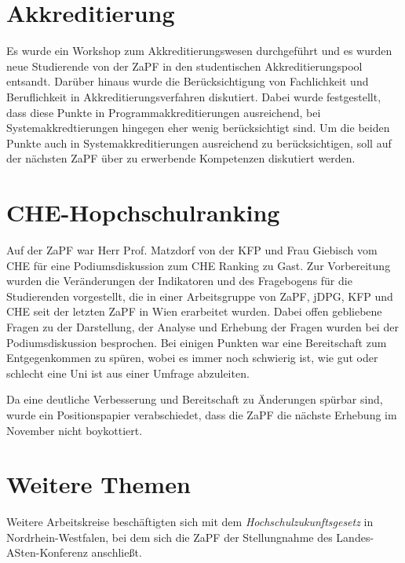 \documentclass{scrartcl}
\begin{document}
\section*{Akkreditierung}
Es  wurde ein Workshop zum Akkreditierungswesen durchgef\"uhrt und es wurden neue  Studierende von der ZaPF in den studentischen Akkreditierungspool entsandt. Dar\"uber hinaus wurde die Ber\"ucksichtigung von Fachlichkeit und Beruflichkeit in Akkreditierungsverfahren diskutiert. Dabei wurde festgestellt, dass diese Punkte in Programmakkreditierungen ausreichend, bei Systemakkredtierungen hingegen eher wenig ber\"ucksichtigt sind. Um die beiden Punkte auch in Systemakkreditierungen ausreichend zu  ber\"ucksichtigen, soll auf der n\"achsten ZaPF \"uber zu erwerbende Kompetenzen diskutiert werden.

\section*{CHE-Hopchschulranking}
Auf der ZaPF war Herr Prof. Matzdorf von der KFP und Frau Giebisch vom CHE für  eine Podiumsdiskussion zum CHE Ranking zu Gast. Zur Vorbereitung wurden die Ver\"anderungen der Indikatoren und des Fragebogens für die  Studierenden vorgestellt, die in einer Arbeitsgruppe von ZaPF,  jDPG, KFP und CHE seit der letzten ZaPF in Wien erarbeitet wurden. Dabei  offen gebliebene Fragen zu der Darstellung, der Analyse und Erhebung der  Fragen wurden bei der Podiumsdiskussion besprochen. Bei einigen Punkten  war eine Bereitschaft zum Entgegenkommen zu sp\"uren, wobei es immer noch schwierig ist, wie gut oder schlecht eine Uni ist aus einer Umfrage  abzuleiten.

Da eine deutliche Verbesserung und Bereitschaft zu \"Anderungen sp\"urbar  sind, wurde ein Positionspapier verabschiedet, dass die ZaPF die n\"achste Erhebung im November nicht boykottiert.

\section*{Weitere Themen}
Weitere  Arbeitskreise besch\"aftigten sich mit dem  \emph{Hochschulzukunftsgesetz} in Nordrhein-Westfalen, bei dem sich die  ZaPF der Stellungnahme des Landes-ASten-Konferenz anschlie\ss t.
\end{document}
